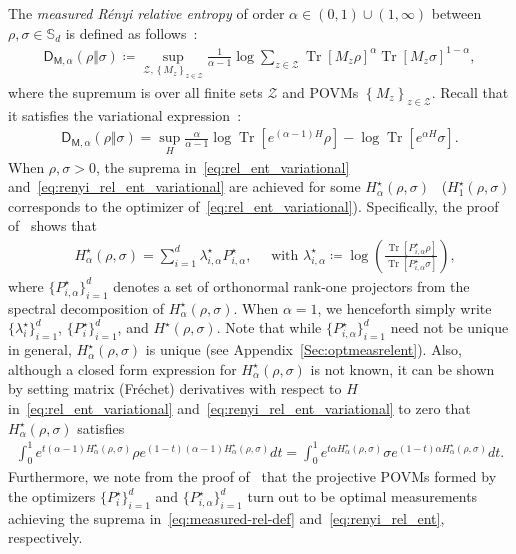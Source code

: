 \documentclass[a4paper,onecolumn,11pt,accepted=2026-05-12]{quantumarticle}
\newcommand{\sD}{\mathsf{D}}
\newcommand{\cZ}{\mathcal{Z}}
\begin{document}
The \emph{measured R\'{e}nyi relative  entropy} of order $\alpha \in (0, 1) \cup (1,\infty)$ between $\rho,\sigma \in \mathbb{S}_d$ is defined as follows~\cite[Eqs.~(3.116)--(3.117)]{F96}:
\begin{align}
\sD_{\mathsf{M},\alpha}(\rho\Vert\sigma) \coloneqq 
\sup_{\cZ,\left\{  M_z\right\}  _{z\in\cZ}
} \frac{1}{\alpha-1}\log  \sum_{z\in\cZ} \operatorname{Tr}[M_z\rho]^{\alpha}\operatorname{Tr}[M_z\sigma]^{1-\alpha} ,
\label{eq:renyi_rel_ent}
\end{align}
where the supremum is over all finite sets $\cZ$ and POVMs  $\left\{  M_z\right\}_{z\in\cZ}$.
 Recall that it satisfies the  variational expression~\cite[Lemma~3]{Berta2015OnEntropies}:
 \begin{align}
\sD_{\mathsf{M},\alpha}(\rho\Vert\sigma)  =\sup_{H}\frac{\alpha}{\alpha-1}\log  \operatorname{Tr}[e^{\left(  \alpha-1\right)  H}\rho
]-\log  \operatorname{Tr}[e^{\alpha H}\sigma].
\label{eq:renyi_rel_ent_variational}
 \end{align}
When $\rho,\sigma>0$, the suprema in~\eqref{eq:rel_ent_variational} and~\eqref{eq:renyi_rel_ent_variational} are achieved for some $H_{\alpha}^{\star}(\rho,\sigma)$~\cite[Lemma~1 and Lemma~3]{Berta2015OnEntropies} ($H_{1}^{\star}(\rho,\sigma)$ corresponds to the optimizer of~\eqref{eq:rel_ent_variational}). Specifically, the  proof of~\cite[Lemma~1 and Theorem~2]{Berta2015OnEntropies} shows that
\begin{align}
&H_{\alpha}^{\star}(\rho,\sigma)= \sum_{i=1}^d\lambda_{i,\alpha}^{\star}  P_{i,\alpha}^{\star}, \quad \mbox{ with } \lambda_{i,\alpha}^{\star} \coloneqq \log  \!\left(\frac{\operatorname{Tr}[P_{i,\alpha}^{\star} \rho]}{\operatorname{Tr}[P_{i,\alpha}^{\star} \sigma]}\right),\label{eq:opteigvalues}     
\end{align}
 where $\{P_{i,\alpha}^{\star}\}_{i=1}^d$ denotes a set of orthonormal rank-one projectors from the spectral decomposition of $H_{\alpha}^{\star}(\rho,\sigma)$. When $\alpha=1$, we henceforth simply write 
 $\{\lambda_{i}^{\star}\}_{i=1}^d$, $\{P_{i}^{\star}\}_{i=1}^d$, and $H^{\star}(\rho,\sigma)$. 
 Note that while $\{P_{i,\alpha}^{\star}\}_{i=1}^d$ 
 need not be unique in general, $H_{\alpha}^{\star}(\rho,\sigma)$ is unique (see Appendix~\ref{Sec:optmeasrelent}). 
 Also, although a closed form expression for $H_{\alpha}^{\star}(\rho,\sigma)$ is not known, it can be shown   by setting matrix (Fr\'{e}chet) derivatives  with respect to $H$ in~\eqref{eq:rel_ent_variational} and~\eqref{eq:renyi_rel_ent_variational}  to zero  that 
$H_{\alpha}^{\star}(\rho,\sigma)$  satisfies 
 \begin{align}
\int_{0}^1 e^{t(\alpha-1) H_{\alpha}^{\star}(\rho,\sigma)} \rho e^{(1-t) (\alpha-1) H_{\alpha}^{\star}(\rho,\sigma)} dt=\int_{0}^1 e^{t \alpha H_{\alpha}^{\star}(\rho,\sigma)} \sigma e^{(1-t)\alpha H_{\alpha}^{\star}(\rho,\sigma)} dt.\label{eq:optrenmeasrelent}
 \end{align}
 Furthermore, we note from the proof of~\cite[Lemma~1 and Theorem~2]{Berta2015OnEntropies}  that the projective POVMs formed by the optimizers $\{P_{i}^{\star}\}_{i=1}^d$ and $\{P_{i,\alpha}^{\star}\}_{i=1}^d$  turn out to be optimal measurements achieving the suprema in~\eqref{eq:measured-rel-def} and~\eqref{eq:renyi_rel_ent}, respectively. 
 
\end{document}
